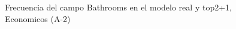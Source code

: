 \begin{figure}[H]
    \centering
    
    \caption{Frecuencia del campo Bathrooms en el modelo real y top2+1, Economicos (A-2)}
    \label{frecuency-Bathrooms-top2+1}
\end{figure}
